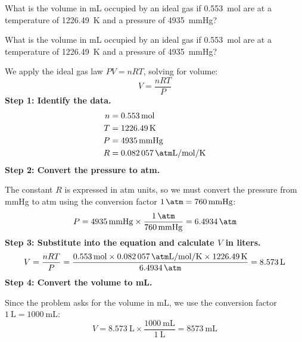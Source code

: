 \begin{exercise}
    What is the volume in mL occupied by an ideal gas if \qty{0.553}{\mol} are at a temperature of \qty{1226.49}{\kelvin} and a pressure of \qty{4935}{\mmHg}?
    \begin{solu}
        What is the volume in mL occupied by an ideal gas if \qty{0.553}{\mol} are at a temperature of \qty{1226.49}{\kelvin} and a pressure of \qty{4935}{\mmHg}?

        We apply the ideal gas law $PV = nRT$, solving for volume:
        \begin{equation*}
            V = \frac{nRT}{P}
        \end{equation*}
        \textbf{Step 1: Identify the data.}
        \begin{align*}
            n &= \qty{0.553}{\mol} \\
            T &= \qty{1226.49}{\kelvin} \\
            P &= \qty{4935}{\mmHg} \\
            R &= \qty{0.082057}{\atm\liter\per\mol\per\kelvin}
        \end{align*}
        \textbf{Step 2: Convert the pressure to atm.}

        The constant $R$ is expressed in atm units, so we must convert the pressure from mmHg to atm using the conversion factor $\qty{1}{\atm} = \qty{760}{\mmHg}$:
        \begin{equation*}
            P = \qty{4935}{\mmHg} \times \frac{\qty{1}{\atm}}{\qty{760}{\mmHg}} = \qty{6.4934}{\atm}
        \end{equation*}
        \textbf{Step 3: Substitute into the equation and calculate $V$ in liters.}
        \begin{equation*}
            V = \frac{nRT}{P} = \frac{\qty{0.553}{\mol} \times \qty{0.082057}{\atm\liter\per\mol\per\kelvin} \times \qty{1226.49}{\kelvin}}{\qty{6.4934}{\atm}} = \qty{8.573}{\liter}
        \end{equation*}
        \textbf{Step 4: Convert the volume to mL.}

        Since the problem asks for the volume in mL, we use the conversion factor $\qty{1}{\liter} = \qty{1000}{\mL}$:
        \begin{equation*}
            V = \qty{8.573}{\liter} \times \frac{\qty{1000}{\mL}}{\qty{1}{\liter}} = \boxed{\qty{8573}{\mL}}
        \end{equation*}
    \end{solu}
\end{exercise}
